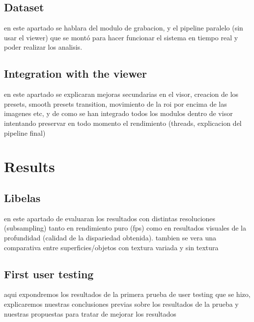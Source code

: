 \documentclass[10pt,a4paper,twocolumn,twoside]{article}
\begin{document}
	\subsection{Dataset}
	en este apartado se hablara del modulo de grabacion, y el pipeline paralelo (sin usar el viewer) que se montó para hacer funcionar el sistema en tiempo real y poder realizar los analisis.
	
	\subsection{Integration with the viewer}
	en este apartado se explicaran mejoras secundarias en el visor, creacion de los presets, smooth presets transition, movimiento de la roi por encima de las imagenes etc, y de como se han integrado todos los modulos dentro de visor intentando preservar en todo momento el rendimiento (threads, explicacion del pipeline final)

	
	\section{Results}
	
	
	\subsection{Libelas}
	en este apartado de evaluaran los resultados con distintas resoluciones (subsampling) tanto en rendimiento puro (fps) como en resultados visuales de la profundidad (calidad de la dispariedad obtenida). tambien se vera una comparativa entre superficies/objetos con textura variada y sin textura
	
	\subsection{First user testing}
	aqui expondremos los resultados de la primera prueba de user testing que se hizo, explicaremos nuestras conclusiones previas sobre los resultados de la prueba y nuestras propuestas para tratar de mejorar los resultados
	
\end{document}
